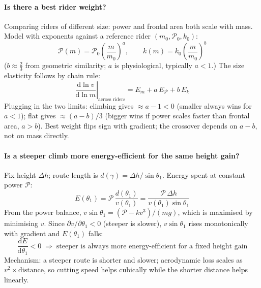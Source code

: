 \documentclass[10pt]{extarticle}
\numberwithin{equation}{subsubsection}
\begin{document}
\paragraph{Is there a best rider weight?}
Comparing riders of different size: power and frontal area both scale with mass. Model with
exponents against a reference rider $(m_0, \mathcal{P}_0, k_0)$:
\begin{equation}
    \mathcal{P}(m) = \mathcal{P}_0\!\left(\frac{m}{m_0}\right)^{a}, \qquad
    k(m) = k_0\!\left(\frac{m}{m_0}\right)^{b}
\end{equation}
($b \approx \tfrac{2}{3}$ from geometric similarity; $a$ is physiological, typically $a < 1$.)
The size elasticity follows by chain rule:
\begin{equation}
    \boxed{\left.\frac{\mathrm{d}\ln v}{\mathrm{d}\ln m}\right|_{\text{across riders}}
    = E_m + a\,E_{\mathcal{P}} + b\,E_k}
\end{equation}
Plugging in the two limits: climbing gives $\approx a - 1 < 0$ (smaller always wins for $a < 1$);
flat gives $\approx (a-b)/3$ (bigger wins if power scales faster than frontal area, $a > b$).
Best weight flips sign with gradient; the crossover depends on $a - b$, not on mass directly.

\paragraph{Is a steeper climb more energy-efficient for the same height gain?}
Fix height $\Delta h$; route length is $d(\gamma) = \Delta h / \sin\theta_1$. Energy spent at
constant power $\mathcal{P}$:
\begin{equation}
    E(\theta_1) = \mathcal{P}\,\frac{d(\theta_1)}{v(\theta_1)}
    = \frac{\mathcal{P}\,\Delta h}{v(\theta_1)\sin\theta_1}
\end{equation}
From the power balance, $v\sin\theta_1 = (\mathcal{P} - kv^3)/(mg)$, which is maximised by
minimising $v$. Since $\partial v/\partial\theta_1 < 0$ (steeper is slower),
$v\sin\theta_1$ rises monotonically with gradient and $E(\theta_1)$ falls:
\begin{equation}
    \frac{\mathrm{d}E}{\mathrm{d}\theta_1} < 0
    \;\Longrightarrow\;
    \text{steeper is always more energy-efficient for a fixed height gain}
\end{equation}
Mechanism: a steeper route is shorter and slower; aerodynamic loss scales as $v^2 \times
\text{distance}$, so cutting speed helps cubically while the shorter distance helps linearly.
\end{document}
